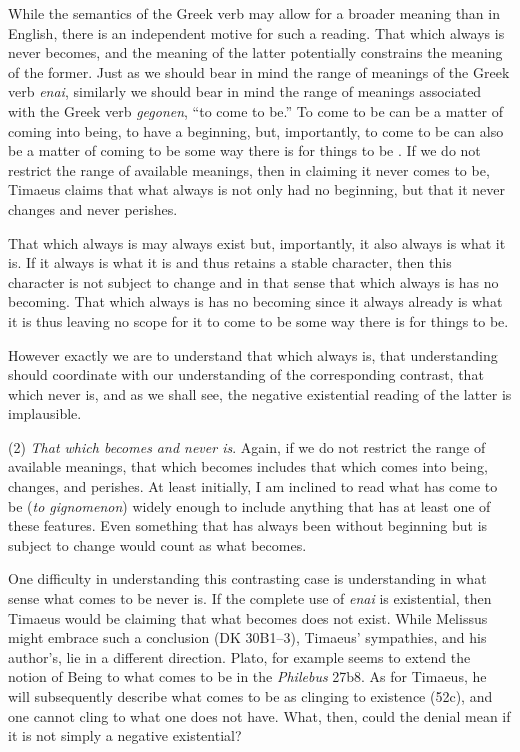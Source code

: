 While the semantics of the Greek verb may allow for a broader meaning than in English, there is an independent motive for such a reading. That which always is never becomes, and the meaning of the latter potentially constrains the meaning of the former. Just as we should bear in mind the range of meanings of the Greek verb \emph{enai}, similarly we should bear in mind the range of meanings associated with the Greek verb \emph{gegonen}, ``to come to be.'' To come to be can be a matter of coming into being, to have a beginning, but, importantly, to come to be can also be a matter of coming to be some way there is for things to be \citep[24--5]{Cornford:1935fk}. If we do not restrict the range of available meanings, then in claiming it never comes to be, Timaeus claims that what always is not only had no beginning, but that it never changes and never perishes. 

That which always is may always exist but, importantly, it also always is what it is. If it always is what it is and thus retains a stable character, then this character is not subject to change and in that sense that which always is has no becoming. That which always is has no becoming since it always already is what it is thus leaving no scope for it to come to be some way there is for things to be. 

However exactly we are to understand that which always is, that understanding should coordinate with our understanding of the corresponding contrast, that which never is, and as we shall see, the negative existential reading of the latter is implausible.


(2) \emph{That which becomes and never is}. Again, if we do not restrict the range of available meanings, that which becomes includes that which comes into being, changes, and perishes. At least initially, I am inclined to read what has come to be (\emph{to gignomenon}) widely enough to include anything that has at least one of these features. Even something that has always been without beginning but is subject to change would count as what becomes.

One difficulty in understanding this contrasting case is understanding in what sense what comes to be never is. If the complete use of \emph{enai} is existential, then Timaeus would be claiming that what becomes does not exist. While Melissus might embrace such a conclusion (DK 30B1--3), Timaeus' sympathies, and his author's, lie in a different direction. Plato, for example seems to extend the notion of Being to what comes to be in the \emph{Philebus} 27b8. As for Timaeus, he will subsequently describe what comes to be as clinging to existence (52c), and one cannot cling to what one does not have. What, then, could the denial mean if it is not simply a negative existential?

